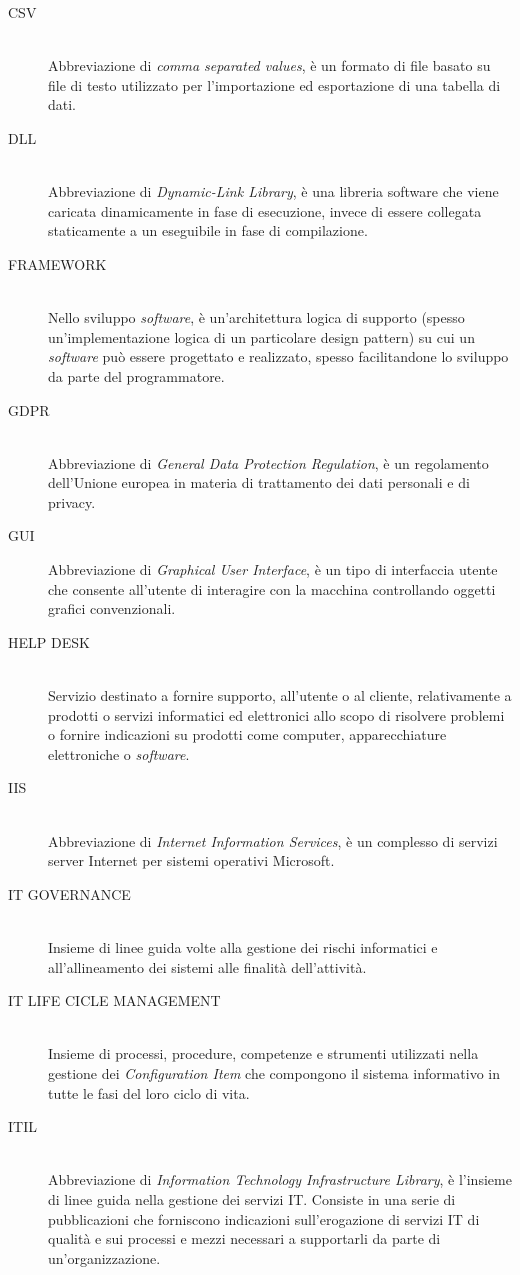 \begin{description}
  \item[CSV] \hfill \\ Abbreviazione di \emph{comma separated values}, è un formato di file basato su file di testo utilizzato per l'importazione ed esportazione di una tabella di dati. 
  \item[DLL] \hfill \\ Abbreviazione di \emph{Dynamic-Link Library}, è una libreria software che viene caricata dinamicamente in fase di esecuzione, invece di essere collegata staticamente a un eseguibile in fase di compilazione. 
  \item[FRAMEWORK] \hfill \\ Nello sviluppo \emph{software}, è un'architettura logica di supporto (spesso un'implementazione logica di un particolare design pattern) su cui un \emph{software} può essere progettato e realizzato, spesso facilitandone lo sviluppo da parte del programmatore.
  \item[GDPR] \hfill \\ Abbreviazione di \emph{General Data Protection Regulation}, è un regolamento dell'Unione europea in materia di trattamento dei dati personali e di privacy. 
  \item[GUI] Abbreviazione di \emph{Graphical User Interface}, è un tipo di interfaccia utente che consente all’utente di interagire con la macchina controllando oggetti grafici convenzionali.
 \item[HELP DESK] \hfill \\ Servizio destinato a fornire supporto, all'utente o al cliente, relativamente a prodotti o servizi informatici ed elettronici allo scopo di risolvere problemi o fornire indicazioni su prodotti come computer, apparecchiature elettroniche o \emph{software}. 
 \item[IIS] \hfill \\ Abbreviazione di \emph{Internet Information Services}, è un complesso di servizi server Internet per sistemi operativi Microsoft.
 \item[IT GOVERNANCE] \hfill \\ Insieme di linee guida volte alla gestione dei rischi informatici e all'allineamento dei sistemi alle finalità dell'attività.
 \item[IT LIFE CICLE MANAGEMENT] \hfill \\ Insieme di processi, procedure, competenze e strumenti utilizzati nella gestione dei \emph{Configuration Item} che compongono il sistema informativo in tutte le fasi del loro ciclo di vita.
\item[ITIL]\hfill \\ Abbreviazione di \emph{Information Technology Infrastructure Library}, è l'insieme di linee guida nella gestione dei servizi IT. Consiste in una serie di pubblicazioni che forniscono indicazioni sull'erogazione di servizi IT di qualità e sui processi e mezzi necessari a supportarli da parte di un'organizzazione. 

\end{description}
